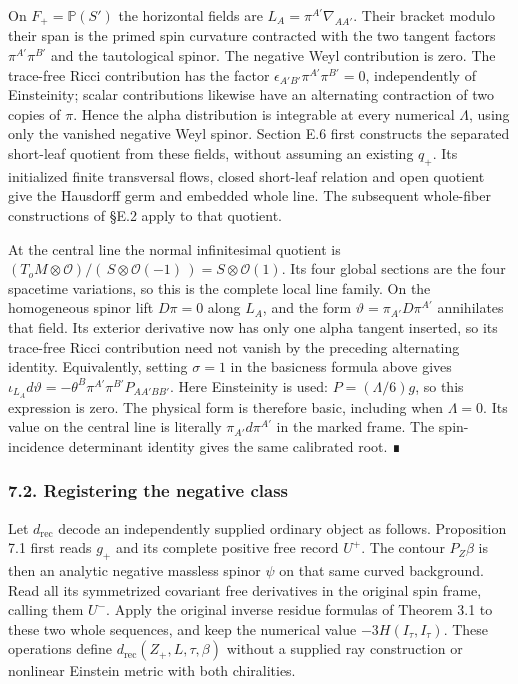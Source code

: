 \documentclass[
  english,
  11pt,
  reqno]{amsart}
\begin{document}
On \(F_+=\mathbb P(S')\) the horizontal fields are
\(L_A=\pi^{A'}\nabla_{AA'}\). Their bracket modulo their span is the
primed spin curvature contracted with the two tangent factors
\(\pi^{A'}\pi^{B'}\) and the tautological spinor. The negative Weyl
contribution is zero. The trace-free Ricci contribution has the factor
\(\epsilon_{A'B'}\pi^{A'}\pi^{B'}=0\), independently of Einsteinity;
scalar contributions likewise have an alternating contraction of two
copies of \(\pi\). Hence the alpha distribution is integrable at every
numerical \(\Lambda\), using only the vanished negative Weyl spinor.
Section E.6 first constructs the separated short-leaf quotient from
these fields, without assuming an existing \(q_+\). Its initialized
finite transversal flows, closed short-leaf relation and open quotient
give the Hausdorff germ and embedded whole line. The subsequent
whole-fiber constructions of §E.2 apply to that quotient.

At the central line the normal infinitesimal quotient is
\((T_oM\otimes\mathcal O)/(\,S\otimes\mathcal O(-1)\,)
=S\otimes\mathcal O(1)\). Its four global sections are the four
spacetime variations, so this is the complete local line family. On the
homogeneous spinor lift \(D\pi=0\) along \(L_A\), and the form
\(\vartheta=\pi_{A'}D\pi^{A'}\) annihilates that field. Its exterior
derivative now has only one alpha tangent inserted, so its trace-free
Ricci contribution need not vanish by the preceding alternating
identity. Equivalently, setting \(\sigma=1\) in the basicness formula
above gives
\(\iota_{L_A}d\vartheta=-\theta^B\pi^{A'}\pi^{B'}P_{AA'BB'}\). Here
Einsteinity is used: \(P=(\Lambda/6)g\), so this expression is zero. The
physical form is therefore basic, including when \(\Lambda=0\). Its
value on the central line is literally \(\pi_{A'}d\pi^{A'}\) in the
marked frame. The spin-incidence determinant identity gives the same
calibrated root. ∎

\protect{}\label{sec:gg-negative-registration}

\subsubsection{7.2. Registering the negative
class}\label{registering-the-negative-class}

Let \(d_{\mathrm{rec}}\) decode an independently supplied ordinary
object as follows. Proposition 7.1 first reads \(g_+\) and its complete
positive free record \(U^+\). The contour \(P_Z\beta\) is then an
analytic negative massless spinor \(\psi\) on that same curved
background. Read all its symmetrized covariant free derivatives in the
original spin frame, calling them \(U^-\). Apply the original inverse
residue formulas of Theorem 3.1 to these two whole sequences, and keep
the numerical value \(-3H(I_\tau,I_\tau)\). These operations define
\(d_{\mathrm{rec}}(Z_+,L,\tau,\beta)\) without a supplied ray
construction or nonlinear Einstein metric with both chiralities.
\end{document}
